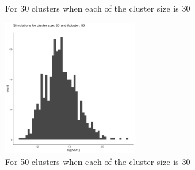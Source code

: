 \documentclass[
  letterpaper,
  DIV=11,
  numbers=noendperiod]{scrartcl}
\begin{document}
\begin{figure}
\begin{minipage}[t]{0.11\linewidth}
{\centering 

~

}

\end{minipage}%
%
\begin{minipage}[t]{0.44\linewidth}

{\centering 


\caption{For 30 clusters when each of the cluster size is 30}

}

\end{minipage}%

\end{figure}

\vspace{5mm}

\begin{figure}[H]

{\centering \includegraphics[width=0.5\textwidth,height=\textheight]{../plots/hist_50_30.png}

}

\caption{For 50 clusters when each of the cluster size is 30}

\end{figure}
\end{document}
